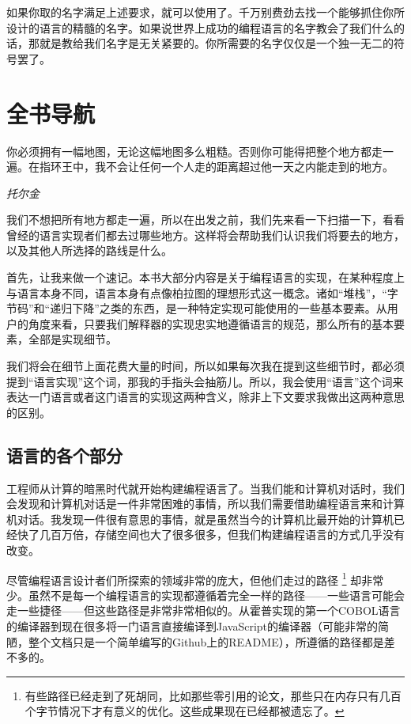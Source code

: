 \documentclass[cn,10pt,math=newtx,citestyle=gb7714-2015,bibstyle=gb7714-2015]{elegantbook}
\begin{document}
如果你取的名字满足上述要求，就可以使用了。千万别费劲去找一个能够抓住你所设计的语言的精髓的名字。如果说世界上成功的编程语言的名字教会了我们什么的话，那就是教给我们名字是无关紧要的。你所需要的名字仅仅是一个独一无二的符号罢了。

\chapter{全书导航}

\epigraph{你必须拥有一幅地图，无论这幅地图多么粗糙。否则你可能得把整个地方都走一遍。在指环王中，我不会让任何一个人走的距离超过他一天之内能走到的地方。}{\textit{托尔金}}

我们不想把所有地方都走一遍，所以在出发之前，我们先来看一下扫描一下，看看曾经的语言实现者们都去过哪些地方。这样将会帮助我们认识我们将要去的地方，以及其他人所选择的路线是什么。

首先，让我来做一个速记。本书大部分内容是关于编程语言的实现，在某种程度上与语言本身不同，语言本身有点像柏拉图的理想形式这一概念。诸如“堆栈”，“字节码”和“递归下降”之类的东西，是一种特定实现可能使用的一些基本要素。从用户的角度来看，只要我们解释器的实现忠实地遵循语言的规范，那么所有的基本要素，全部是实现细节。

我们将会在细节上面花费大量的时间，所以如果每次我在提到这些细节时，都必须提到“语言实现”这个词，那我的手指头会抽筋儿。所以，我会使用“语言”这个词来表达一门语言或者这门语言的实现这两种含义，除非上下文要求我做出这两种意思的区别。

\section{语言的各个部分}

工程师从计算的暗黑时代就开始构建编程语言了。当我们能和计算机对话时，我们会发现和计算机对话是一件非常困难的事情，所以我们需要借助编程语言来和计算机对话。我发现一件很有意思的事情，就是虽然当今的计算机比最开始的计算机已经快了几百万倍，存储空间也大了很多很多，但我们构建编程语言的方式几乎没有改变。

尽管编程语言设计者们所探索的领域非常的庞大，但他们走过的路径 \footnote{有些路径已经走到了死胡同，比如那些零引用的论文，那些只在内存只有几百个字节情况下才有意义的优化。这些成果现在已经都被遗忘了。} 却非常少。虽然不是每一个编程语言的实现都遵循着完全一样的路径——一些语言可能会走一些捷径——但这些路径是非常非常相似的。从霍普实现的第一个COBOL语言的编译器到现在很多将一门语言直接编译到JavaScript的编译器（可能非常的简陋，整个文档只是一个简单编写的Github上的README），所遵循的路径都是差不多的。
\end{document}
